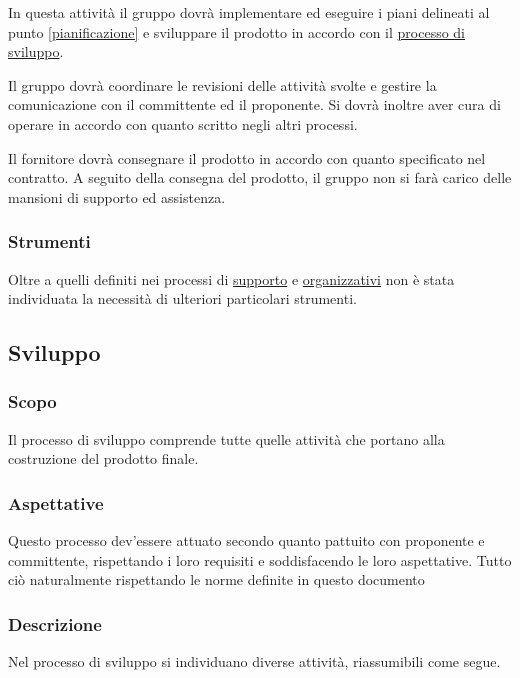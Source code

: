             In questa attività il gruppo \group dovrà implementare ed eseguire i piani delineati al punto \ref{pianificazione} e sviluppare il prodotto in accordo con il \hyperref[sviluppo]{processo di sviluppo}.

            Il gruppo dovrà coordinare le revisioni delle attività svolte e gestire la comunicazione con il committente ed il proponente. Si dovrà inoltre aver cura di operare in accordo con quanto scritto negli altri processi.


            Il fornitore dovrà consegnare il prodotto in accordo con quanto specificato nel contratto. A seguito della consegna del prodotto, il gruppo \group non si farà carico delle mansioni di supporto ed assistenza.
    \subsubsection{Strumenti}
        Oltre a quelli definiti nei processi di \hyperref[supporto]{supporto} e \hyperref[organizzativi]{organizzativi} non è stata individuata la necessità di ulteriori particolari strumenti.

\subsection{Sviluppo}
\label{sviluppo}
    \subsubsection{Scopo}
        Il processo di sviluppo comprende tutte quelle attività che portano alla costruzione del prodotto finale.
    \subsubsection{Aspettative}
        Questo processo dev'essere attuato secondo quanto pattuito con proponente e committente, rispettando i loro requisiti e soddisfacendo le loro aspettative. Tutto ciò naturalmente rispettando le norme definite in questo documento
    \subsubsection{Descrizione}
        Nel processo di sviluppo si individuano  diverse attività, riassumibili come segue.

